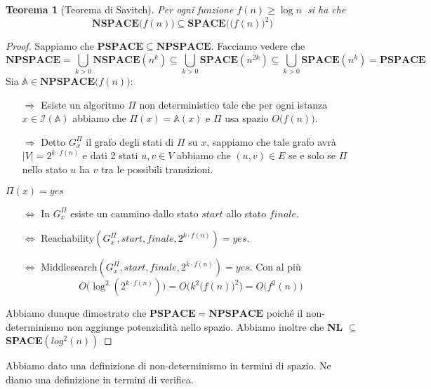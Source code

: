 \documentclass[a4paper]{article}
\newtheorem{thm}{Teorema}[subsection]
\theoremstyle{definition}
\newcommand{\Space}{\mathbf{SPACE}}
\newcommand{\pspace}{\mathbf{PSPACE}}
\newcommand{\nspace}{\mathbf{NSPACE}}
\newcommand{\npspace}{\mathbf{NPSPACE}}
\newcommand{\prob}[1]{\mathbb{#1}}
\newcommand{\instance}[1]{\mathcal{I}(\prob{#1})}
\begin{document}
			\begin{thm}[Teorema di Savitch]
				Per ogni funzione $ f(n) \geq \log n \ $ si ha che
				\[
					\nspace\big(f(n)\big) \subseteq \Space\Big(\big(f(n)\big)^2\Big)
				\]
			\end{thm}
			
			\begin{proof}
				Sappiamo che $ \pspace \subseteq \npspace $. Facciamo vedere che 
				\[
					\npspace = \bigcup\limits_{k > 0} \nspace(n^k) \subseteq \bigcup\limits_{k > 0} \Space(n^{2k}) \subseteq \bigcup\limits_{k > 0} \Space(n^k) = \pspace
				\]
				Sia $ \prob{A}\in \npspace\big(f(n)\big) $:
				\begin{itemize}
					\item[$ \Rightarrow $] Esiste un algoritmo $ \Pi $ non deterministico tale che per ogni istanza $ x \in \instance{\prob{A}} $ abbiamo che $ \Pi(x) = \prob{A}(x) $ e $ \Pi $ usa spazio $ O\big(f(n)\big) $.
					\item[$ \Rightarrow $] Detto $ G_x^{\Pi} $ il grafo degli stati di $ \Pi $ su $ x $, sappiamo che tale grafo avrà $ |V| = 2^{k\cdot f(n)} $ e dati 2 stati $ u, v \in V $ abbiamo che $ (u,v)\in E $ se e solo se $ \Pi $ nello stato $ u $ ha $ v $ tra le possibili transizioni.
				\end{itemize}
				$ \Pi(x) = yes $
				\begin{itemize}
					\item[$ \Leftrightarrow $] In $ G_x^{\Pi} $ esiste un cammino dallo stato $ start $ allo stato $ finale $.
					\item[$ \Leftrightarrow $] Reachability$(G_x^{\Pi}, start, finale, 2^{k\cdot f(n)} ) = yes $.
					\item[$ \Leftrightarrow $] Middlesearch$(G_x^{\Pi}, start, finale, 2^{k\cdot f(n)} ) = yes $. Con al più 
					\[
						O\big(\log^2(2^{k\cdot f(n)})\big) = O\Big(k^2\big(f(n)\big)^2\Big) = O\big(f^2(n)\big)
					\]
					
				\end{itemize}
			
			\noindent
			Abbiamo dunque dimostrato che $\pspace = \npspace$ poiché il non-determinismo non aggiunge potenzialità nello spazio. Abbiamo inoltre che \textbf{NL} $\subseteq$ \textbf{SPACE}$(log^2(n))$
			
			\end{proof}
		
		\noindent
		Abbiamo dato una definizione di non-determinismo in termini di spazio. Ne diamo una definizione in termini di verifica.
		
\end{document}

